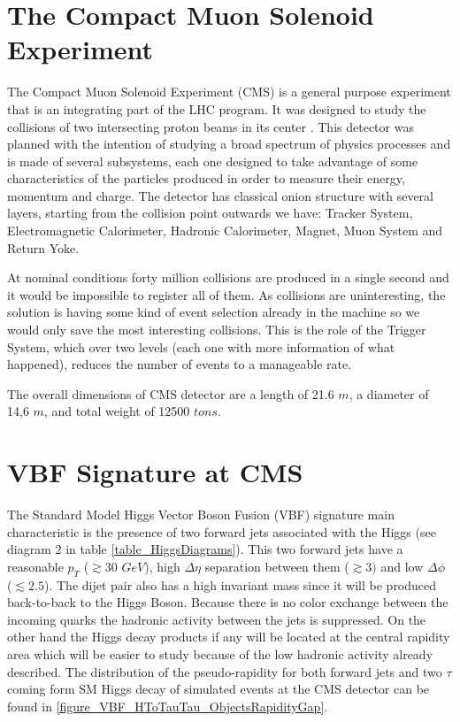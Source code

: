 \documentclass[%
 reprint,
 amsmath,
 amssymb,
 aps,
 pra,
 showkeys
]{revtex4-1}
\begin{document}
\section{The Compact Muon Solenoid Experiment}

The Compact Muon Solenoid Experiment (CMS) is a general purpose experiment that is an integrating part of the LHC
program. It was designed to study the collisions of two intersecting proton beams in its center \cite{article:CMSTDRv12006}. 
This detector was planned with the intention of studying a broad spectrum of physics processes and is made of several
subsystems, each one designed to take advantage of some characteristics of the particles produced in order to
measure their energy, momentum and charge. The detector has classical onion structure with several layers, starting
from the collision point outwards we have: Tracker System, Electromagnetic Calorimeter, Hadronic Calorimeter,
Magnet, Muon System and Return Yoke.

At nominal conditions forty million collisions are produced in a single second and it would be impossible to 
register all of them. As collisions are uninteresting, the solution is having some kind of event selection 
already in the machine so we would only save the most interesting collisions. This is the role of the Trigger System, 
which over two levels (each one with more information of what happened), reduces the number of events to a 
manageable rate.

The overall dimensions of CMS detector are a length of 21.6 $m$, a diameter of 14,6 $m$, and total weight of 
12500 $tons$.

\section{VBF Signature at CMS}

The Standard Model Higgs Vector Boson Fusion (VBF) signature main characteristic is the presence of two forward jets
associated with the Higgs (see diagram 2 in table \ref{table_HiggsDiagrams}). This two forward jets have a reasonable 
$p_T$ ($\gtrsim30$ $GeV$), high $\Delta\eta$ separation between them ($\gtrsim 3)$ and low $\Delta\phi$ ($\lesssim 2.5$). 
The dijet pair also has a high invariant mass since it will be produced back-to-back to the Higgs Boson. Because there 
is no color exchange between the incoming quarks the hadronic activity between the jets is suppressed. On the other 
hand the Higgs decay products if any will be located at the central rapidity area which will be easier to study because of the low hadronic activity
already described\cite{article:Dokshitzer:1991he}. The distribution of the pseudo-rapidity for both forward jets and two $\tau$ coming form SM Higgs
decay of simulated events at the CMS detector can be found in \ref{figure_VBF_HToTauTau_ObjectsRapidityGap}.
\end{document}
